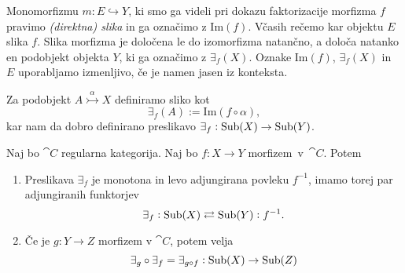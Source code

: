 \documentclass[../kategoricna_logika.tex]{subfiles}
\begin{document}
\begin{definicija}
Monomorfizmu $m : E \hookrightarrow Y$, ki smo ga videli pri dokazu faktorizacije morfizma $f$ pravimo \emph{(direktna) slika} in ga označimo z $\mathrm{Im}(f)$.
Včasih rečemo kar objektu $E$ slika $f$. Slika morfizma je določena le do izomorfizma natančno, a določa natanko en podobjekt objekta $Y$, ki ga označimo z $\exists_f(X)$.
Oznake $\mathrm{Im}(f)$, $\exists_f(X)$ in $E$ uporabljamo izmenljivo, če je namen jasen iz konteksta.

Za podobjekt $A \overset{\alpha}{\rightarrowtail} X$ definiramo sliko kot
$$\exists_f(A) := \mathrm{Im}(f \circ \alpha),$$
kar nam da dobro definirano preslikavo $\exists_f : \operatorname{Sub}(X) \to \operatorname{Sub}(Y)$.
\end{definicija}
\begin{comment}
Če se malo poigramo s temi slikami, dobimo diagram
\begin{equation*}
\begin{tikzcd}
  A \times_Y A \ar[d, shift left , "a_1"] \ar[d, shift right, "a_2"'] \ar[r, dashed, "u"] & X \times_Y X \ar[d, shift left, "p_1"] \ar[d, shift right, "p_2"'] & \\
  A \ar[d, two heads, "a"] \ar[r, tail, "\alpha"] & X \ar[dr, "f"] \ar[r, two heads, "q"] & \exists_f X \ar[d, tail, "m"] \\
  \exists_f A \ar[rr, tail] \ar[urr, dashed, "\dot{\imath}"] & & Y
\end{tikzcd}
\end{equation*}
iz katerega lahko zaradi enoličnosti slik (do izomorfizma natančno) razberemo, da je $\dot{\imath}$ monomorfizem.
\end{comment}
\begin{lema}
  Naj bo $\cat{C}$ regularna kategorija. Naj bo $f : X \to Y$ morfizem~v~$\cat{C}$. Potem
  \begin{enumerate}[label=(\roman*)]
    \item Preslikava $\exists_f$ je monotona in levo adjungirana povleku $f^{-1}$,
      imamo torej par adjungiranih funktorjev
    $$\exists_f : \operatorname{Sub}(X) \rightleftarrows \operatorname{Sub}(Y) : f^{-1}.$$
    \item Če je $g : Y \to Z$ morfizem v $\cat{C}$, potem velja $$\exists_g \circ \exists_f = \exists_{g \circ f} : \operatorname{Sub}(X) \to \operatorname{Sub}(Z)$$
  \end{enumerate}
\end{lema}
\end{document}
